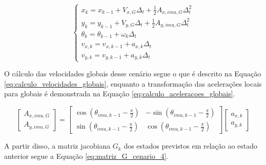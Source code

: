 \documentclass[acronym, symbols, table, deposito]{fei}
\begin{document}
			\begin{equation}\label{eq:predicao_cenario_4}
				\begin{cases}
					x_{k} = x_{k-1} + V_{x,G} \Delta_t + \frac{1}{2}A_{x,imu,G} \Delta_t^2 \\
					y_{k} = y_{k-1} + V_{y,G} \Delta_t + \frac{1}{2}A_{y,imu,G} \Delta_t^2 \\
					\theta_{k} = \theta_{k-1} + \omega_{k} \Delta_t \\
					v_{x,k} = v_{x,k-1} + a_{x,k} \Delta_t\\
					v_{y,k} = v_{y,k-1} + a_{y,k} \Delta_t
				\end{cases}
			\end{equation}

			O cálculo das velocidades globais desse cenário segue o que é descrito na Equação \eqref{eq:calculo_velocidades_globais}, enquanto a transformação das acelerações locais para globais é demonstrada na Equação \eqref{eq:calculo_aceleracoes_globais}.
			
		
			\begin{equation}\label{eq:calculo_aceleracoes_globais}
				\begin{bmatrix}
					A_{x,imu,G} \\
					A_{y,imu,G}
				\end{bmatrix} = 
				\begin{bmatrix}
					\cos(\theta_{imu,k-1} - \frac{\pi}{2}) & -\sin(\theta_{imu,k-1} - \frac{\pi}{2}) \\
					\sin(\theta_{imu,k-1} - \frac{\pi}{2}) & \cos(\theta_{imu,k-1} - \frac{\pi}{2})
				\end{bmatrix}
				\begin{bmatrix}
					a_{x,k} \\
					a_{y,k}
				\end{bmatrix}
			\end{equation}
		
			A partir disso, a matriz jacobiana $G_{k}$ dos estados previstos em relação ao estado anterior segue a Equação \eqref{eq:matriz_G_cenario_4}.
			
\end{document}
